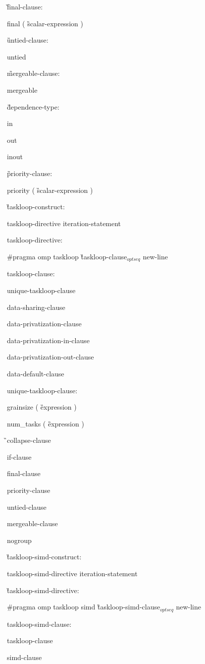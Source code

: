 {\G final-clause:

\C\I final ( \G scalar-expression \C )

\G untied-clause:

\C\I untied

\G mergeable-clause:

\C\I mergeable

\G dependence-type:

\C\I in

\I out

\I inout

\G priority-clause:

\C\I priority ( \G scalar-expression \C )

\G taskloop-construct:

\I taskloop-directive iteration-statement

taskloop-directive:

\C\I \#pragma omp taskloop \G taskloop-clause$_{optseq}$ new-line

taskloop-clause:

\I unique-taskloop-clause 

\I data-sharing-clause

\I data-privatization-clause

\I data-privatization-in-clause

\I data-privatization-out-clause

\I data-default-clause

unique-taskloop-clause:

\C\I grainsize ( \G expression \C )

\I num\_tasks ( \G expression \C )

\G\I collapse-clause

\I if-clause

\I final-clause

\I priority-clause

\I untied-clause

\I mergeable-clause

\C\I nogroup

\G taskloop-simd-construct:

\I taskloop-simd-directive iteration-statement

\G taskloop-simd-directive:

\C\I \#pragma omp taskloop simd \G taskloop-simd-clause$_{optseq}$ new-line

taskloop-simd-clause:

\I taskloop-clause

\I simd-clause

}
